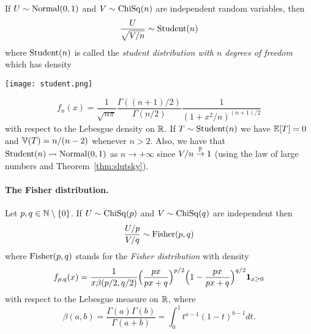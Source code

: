 If $U \sim \operatorname{Normal}(0, 1)$ and $V \sim \operatorname{ChiSq}(n)$ are independent random variables, then
\begin{equation}
	\label{eq:student-definition}
	\frac{U}{\sqrt{V / n}} \sim \operatorname{Student}(n)
\end{equation}
where $\operatorname{Student}(n)$ is called the \emph{student distribution with $n$ degrees of freedom}%
which has density%
\begin{marginfigure}
	\texttt{[image: student.png]}
\end{marginfigure}
\begin{equation*}
	f_n(x) = \frac{1}{\sqrt{n \pi}} \frac{\Gamma((n+1) / 2)}{\Gamma(n/2)} \frac{1}{(1 + x^2 / n)^{(n + 1)/2}}
\end{equation*}
with respect to the Lebesgue density on $\mathbb R$.
If $T \sim \operatorname{Student}(n)$ we have $\mathbb E[T] = 0$ and $\mathbb V(T) = n / (n - 2)$ whenever $n > 2$.
Also, we have that $\operatorname{Student}(n) \leadsto \operatorname{Normal}(0, 1)$ as $n \rightarrow +\infty$ since $V / n \overset{\mathbb P}{\rightarrow} 1$ (using the law of large numbers and Theorem~\ref{thm:slutsky}).


\paragraph{The Fisher distribution.}

Let $p, q \in \mathbb N \setminus \{ 0 \} $. If $U \sim \operatorname{ChiSq}(p)$ and $V \sim \operatorname{ChiSq}(q)$ are independent then
\begin{equation}
	\label{eq:fisher-definition}
	\frac{U / p}{V / q} \sim \operatorname{Fisher}(p, q)
\end{equation}
where $\operatorname{Fisher}(p, q)$ stands for the \emph{Fisher distribution} with density
\begin{equation*}
	f_{p, q}(x) = \frac{1}{x \beta(p/2, q/2)} \Big( \frac{px}{px + q} \Big)^{p/2} \Big(1 - \frac{px}{px + q} \Big)^{q/2} \mathbf 1_{x \geq 0}
\end{equation*}
with respect to the Lebesgue measure on $\mathbb R$, where
\begin{equation}
	\label{eq:beta-function}
	\beta(a, b) = \frac{\Gamma(a) \Gamma(b)}{\Gamma(a + b)}  = \int_0^1 t^{a-1} (1 - t)^{b - 1} dt.
\end{equation}

